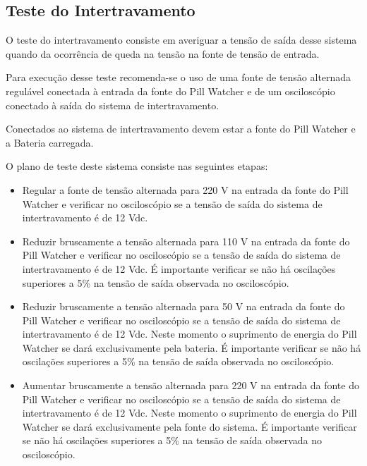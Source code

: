 \subsection{Teste do Intertravamento}
O teste do intertravamento consiste em averiguar a tensão de saída desse sistema quando da ocorrência de queda na tensão na fonte de tensão de entrada.

Para execução desse teste recomenda-se o uso de uma fonte de tensão alternada regulável conectada à entrada da fonte do Pill Watcher e de um osciloscópio conectado à saída do sistema de intertravamento. 

Conectados ao sistema de intertravamento devem estar a fonte do Pill Watcher e a Bateria carregada.

O plano de teste deste sistema consiste nas seguintes etapas:

\begin{itemize}

              \item Regular a fonte de tensão alternada para 220 V na entrada da fonte do Pill Watcher e verificar no osciloscópio se a tensão de saída do sistema de intertravamento é de 12 Vdc.
              \item Reduzir bruscamente a tensão alternada para 110 V na entrada da fonte do Pill Watcher e verificar no osciloscópio se a tensão de saída do sistema de intertravamento é de 12 Vdc. É importante verificar se não há oscilações superiores a 5\% na tensão de saída observada no osciloscópio.
             \item Reduzir bruscamente a tensão alternada para 50 V na entrada da fonte do Pill Watcher e verificar no osciloscópio se a tensão de saída do sistema de intertravamento é de 12 Vdc. Neste momento o suprimento de energia do Pill Watcher se dará exclusivamente pela bateria. É importante verificar se não há oscilações superiores a 5\% na tensão de saída observada no osciloscópio.
             \item Aumentar bruscamente a tensão alternada para 220 V na entrada da fonte do Pill Watcher e verificar no osciloscópio se a tensão de saída do sistema de intertravamento é de 12 Vdc. Neste momento o suprimento de energia do Pill Watcher se dará exclusivamente pela fonte do sistema. É importante verificar se não há oscilações superiores a 5\% na tensão de saída observada no osciloscópio.
     
\end{itemize}
